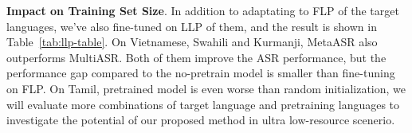 \vspace{5pt}
\noindent
\textbf{Impact on Training Set Size}. In addition to adaptating to FLP of the target languages, we've also fine-tuned on LLP of them, and the result is shown in Table~\ref{tab:llp-table}. On Vietnamese, Swahili and Kurmanji, MetaASR also outperforms MultiASR. Both of them improve the ASR performance, but the performance gap compared to the no-pretrain model is smaller than fine-tuning on FLP. On Tamil, pretrained model is even worse than random initialization, we will evaluate more combinations of target language and pretraining languages to investigate the potential of our proposed method in ultra low-resource scenerio.
